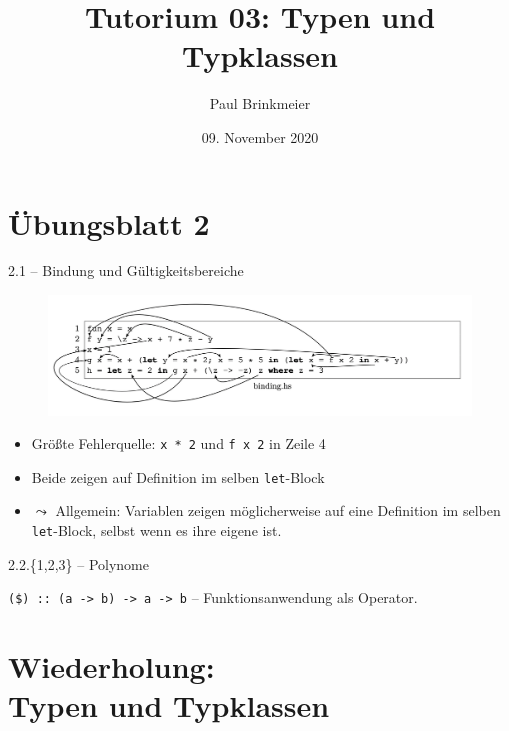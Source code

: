 \documentclass{beamer}
\title{Tutorium 03: Typen und Typklassen}
\author{Paul Brinkmeier}
\institute{Tutorium Programmierparadigmen am KIT}
\date{09. November 2020}
\begin{document}
\begin{frame}
	\titlepage
\end{frame}

\section{Übungsblatt 2}

\begin{frame}{2.1 -- Bindung und Gültigkeitsbereiche}
    \begin{figure}
        \includegraphics[width=\textwidth]{images/binding.png}
    \end{figure}

    \begin{itemize}
        \item Größte Fehlerquelle: \texttt{x * 2} und \texttt{f x 2} in Zeile 4
        \item Beide zeigen auf Definition im selben \texttt{let}-Block
        \item $\leadsto$ Allgemein: Variablen zeigen möglicherweise auf eine Definition im selben \texttt{let}-Block, selbst wenn es ihre eigene ist.
    \end{itemize}
\end{frame}

\begin{frame}{2.2.\{1,2,3\} -- Polynome}

  \texttt{(\$) :: (a -> b) -> a -> b} -- Funktionsanwendung als Operator.
\end{frame}

\section{Wiederholung:\\Typen und Typklassen}
\end{document}

